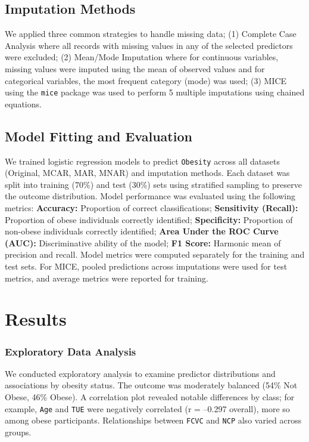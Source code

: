 \documentclass[
  letterpaper,
  DIV=11,
  numbers=noendperiod]{scrartcl}
\begin{document}
\subsection{Imputation Methods}\label{imputation-methods}

We applied three common strategies to handle missing data; (1) Complete
Case Analysis where all records with missing values in any of the
selected predictors were excluded; (2) Mean/Mode Imputation where for
continuous variables, missing values were imputed using the mean of
observed values and for categorical variables, the most frequent
category (mode) was used; (3) MICE using the \texttt{mice} package was
used to perform 5 multiple imputations using chained equations.

\subsection{Model Fitting and
Evaluation}\label{model-fitting-and-evaluation}

We trained logistic regression models to predict \texttt{Obesity} across
all datasets (Original, MCAR, MAR, MNAR) and imputation methods. Each
dataset was split into training (70\%) and test (30\%) sets using
stratified sampling to preserve the outcome distribution. Model
performance was evaluated using the following metrics:
\textbf{Accuracy:} Proportion of correct classifications;
\textbf{Sensitivity (Recall):} Proportion of obese individuals correctly
identified; \textbf{Specificity:} Proportion of non-obese individuals
correctly identified; \textbf{Area Under the ROC Curve (AUC):}
Discriminative ability of the model; \textbf{F1 Score:} Harmonic mean of
precision and recall. Model metrics were computed separately for the
training and test sets. For MICE, pooled predictions across imputations
were used for test metrics, and average metrics were reported for
training.

\newpage

\section{Results}\label{results}

\subsubsection{Exploratory Data
Analysis}\label{exploratory-data-analysis}

We conducted exploratory analysis to examine predictor distributions and
associations by obesity status. The outcome was moderately balanced
(54\% Not Obese, 46\% Obese). A correlation plot revealed notable
differences by class; for example, \texttt{Age} and \texttt{TUE} were
negatively correlated (r = --0.297 overall), more so among obese
participants. Relationships between \texttt{FCVC} and \texttt{NCP} also
varied across groups.
\end{document}
